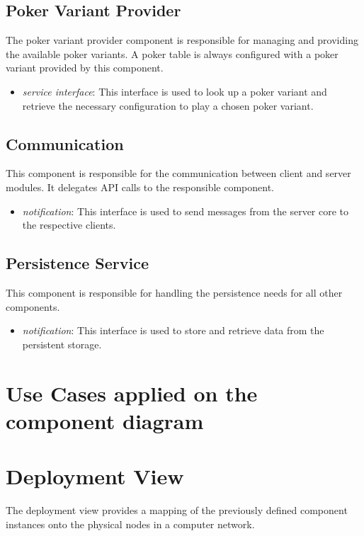 \documentclass[a4paper,11pt]{report}
\begin{document}
\subsection{Poker Variant Provider}
The poker variant provider component is responsible for managing and providing the available poker variants. A  poker table is always configured with a poker variant provided by this component.
\begin{itemize}
\item \emph{service interface}: This interface is used to look up a poker variant and retrieve the necessary configuration to play a chosen poker variant.
\end{itemize}

\subsection{Communication}
This component is responsible for the communication between client and server modules. It delegates API calls to the responsible component.
\begin{itemize}
\item \emph{notification}: This interface is used to send messages from the server core to the respective clients.
\end{itemize}

\subsection{Persistence Service}
This component is responsible for handling the persistence needs for all other components.
\begin{itemize}
\item \emph{notification}: This interface is used to store and retrieve data from the persistent storage.
\end{itemize}

\section{Use Cases applied on the component diagram}
\section{Deployment View}
The deployment view provides a mapping of the previously defined component instances onto the physical nodes in a computer network. 
\end{document}
